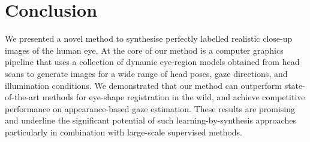 
\section{Conclusion}

We presented a novel method to synthesise perfectly labelled realistic close-up images of the human eye.
At the core of our method is a computer graphics pipeline that uses a collection of dynamic eye-region models obtained from head scans to generate images for a wide range of head poses, gaze directions, and illumination conditions.
We demonstrated that our method can outperform state-of-the-art methods for eye-shape registration in the wild, and achieve competitive performance on appearance-based gaze estimation.
These results are promising and underline the significant potential of such learning-by-synthesis approaches particularly in combination with large-scale supervised methods.